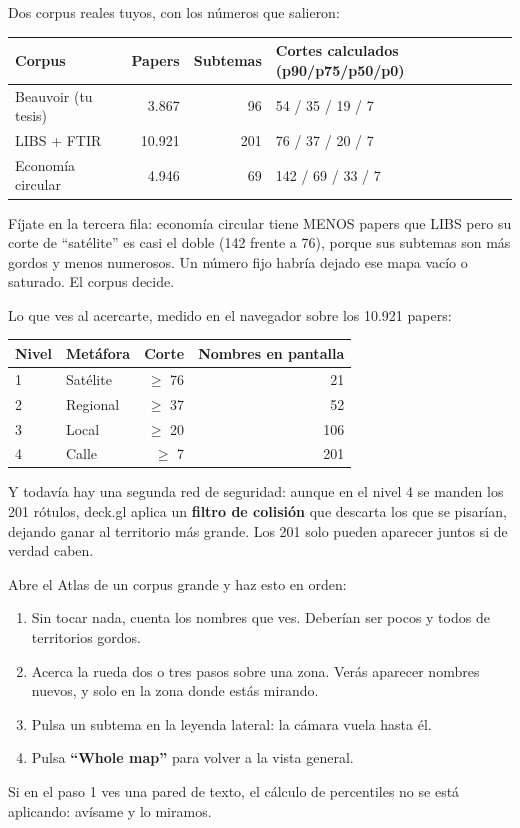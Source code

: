\documentclass[11pt,a4paper]{article}
\begin{document}
Dos corpus reales tuyos, con los números que salieron:

\begin{center}
\begin{tabular}{lrrl}
\hline
Corpus & Papers & Subtemas & Cortes calculados (p90/p75/p50/p0) \\
\hline
Beauvoir (tu tesis)  & 3.867  & 96  & 54 / 35 / 19 / 7 \\
LIBS + FTIR          & 10.921 & 201 & 76 / 37 / 20 / 7 \\
Economía circular    & 4.946  & 69  & 142 / 69 / 33 / 7 \\
\hline
\end{tabular}
\end{center}

Fíjate en la tercera fila: economía circular tiene MENOS papers que LIBS pero su corte de
``satélite'' es casi el doble (142 frente a 76), porque sus subtemas son más gordos y
menos numerosos. Un número fijo habría dejado ese mapa vacío o saturado. El corpus decide.

Lo que ves al acercarte, medido en el navegador sobre los 10.921 papers:

\begin{center}
\begin{tabular}{llrr}
\hline
Nivel & Metáfora & Corte & Nombres en pantalla \\
\hline
1 & Satélite & $\geq$ 76 & 21 \\
2 & Regional & $\geq$ 37 & 52 \\
3 & Local    & $\geq$ 20 & 106 \\
4 & Calle    & $\geq$ 7  & 201 \\
\hline
\end{tabular}
\end{center}

Y todavía hay una segunda red de seguridad: aunque en el nivel 4 se manden los 201
rótulos, deck.gl aplica un \textbf{filtro de colisión} que descarta los que se pisarían,
dejando ganar al territorio más grande. Los 201 solo pueden aparecer juntos si de verdad
caben.

\begin{practica}
Abre el Atlas de un corpus grande y haz esto en orden:
\begin{enumerate}
  \item Sin tocar nada, cuenta los nombres que ves. Deberían ser pocos y todos de
        territorios gordos.
  \item Acerca la rueda dos o tres pasos sobre una zona. Verás aparecer nombres nuevos,
        y solo en la zona donde estás mirando.
  \item Pulsa un subtema en la leyenda lateral: la cámara vuela hasta él.
  \item Pulsa \textbf{``Whole map''} para volver a la vista general.
\end{enumerate}
Si en el paso 1 ves una pared de texto, el cálculo de percentiles no se está aplicando:
avísame y lo miramos.
\end{practica}
\end{document}
